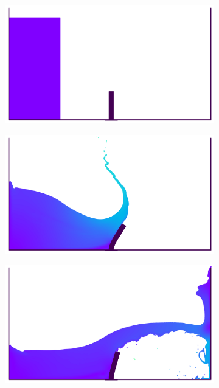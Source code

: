 \begin{figure}[H]
    \centering
  \begin{subfigure}{0.48\textwidth}
    \centering
        \includegraphics[scale=0.5]{figures/fsi/figures/sun_2019_dam_breaking_flow_impacting_an_elastic_plate/snap_t_0.png}
  \end{subfigure}

  \begin{subfigure}{0.48\textwidth}
    \centering
        \includegraphics[scale=0.5]{figures/fsi/figures/sun_2019_dam_breaking_flow_impacting_an_elastic_plate/snap_t_1.png}
  \end{subfigure}

  \begin{subfigure}{0.48\textwidth}
    \centering
        \includegraphics[scale=0.5]{figures/fsi/figures/sun_2019_dam_breaking_flow_impacting_an_elastic_plate/snap_t_2.png}
  \end{subfigure}


\end{figure}
